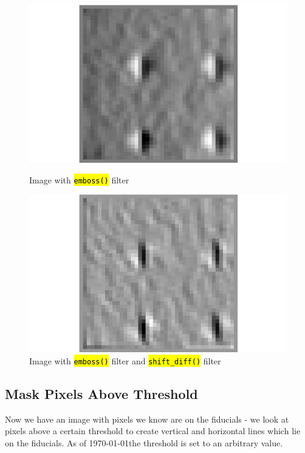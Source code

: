 \documentclass[10pt]{article}
\begin{document}
    \begin{figure}[h]
        \begin{minipage}{0.4\textwidth}
            \begin{center}
                \includegraphics[width=.75\linewidth]{../plots_tables_images/emboss.png}
                \caption{Image with \hl{\texttt{emboss()}} filter}
            \end{center}
        \end{minipage}
        \begin{minipage}{0.4\textwidth}
            \begin{center}
                \includegraphics[width=.75\linewidth]{../plots_tables_images/shiftdiff.png}
                \caption{Image with \hl{\texttt{emboss()}} filter and \hl{\texttt{shift\_diff()}} filter}
            \end{center}
        \end{minipage}
    \end{figure}

    \subsection{Mask Pixels Above Threshold} %
    \label{sub:mask_pixels_above_threshold}
    Now we have an image with pixels we know are on the fiducials - we look at pixels above a certain threshold to create vertical and horizontal lines which lie on the fiducials. As of \today the threshold is set to an arbitrary value. 
\end{document}
